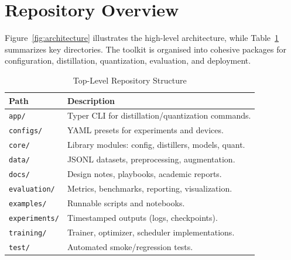 \documentclass[conference]{IEEEtran}
\begin{document}
\section{Repository Overview}
Figure~\ref{fig:architecture} illustrates the high-level architecture, while Table~\ref{tab:directories} summarizes key directories. The toolkit is organised into cohesive packages for configuration, distillation, quantization, evaluation, and deployment.

\begin{table}[!t]
    \caption{Top-Level Repository Structure}
    \label{tab:directories}
    \centering
    \begin{tabular}{ll}
        \toprule
        \textbf{Path} & \textbf{Description} \\ \midrule
        \texttt{app/} & Typer CLI for distillation/quantization commands. \\
        \texttt{configs/} & YAML presets for experiments and devices. \\
        \texttt{core/} & Library modules: config, distillers, models, quant. \\
        \texttt{data/} & JSONL datasets, preprocessing, augmentation. \\
        \texttt{docs/} & Design notes, playbooks, academic reports. \\
        \texttt{evaluation/} & Metrics, benchmarks, reporting, visualization. \\
        \texttt{examples/} & Runnable scripts and notebooks. \\
        \texttt{experiments/} & Timestamped outputs (logs, checkpoints). \\
        \texttt{training/} & Trainer, optimizer, scheduler implementations. \\
        \texttt{test/} & Automated smoke/regression tests. \\
        \bottomrule
    \end{tabular}
\end{table}
\end{document}
